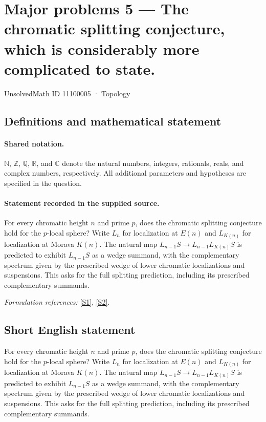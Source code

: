 \documentclass[11pt]{article}
\newcommand{\sref}[2]{\hyperlink{source:#1:#2}{[S#2]}}
\begin{document}
\setcounter{section}{11100004}
\section{Major problems 5 — The chromatic splitting conjecture, which is considerably more complicated to state.}\label{11100005}
{\small UnsolvedMath ID 11100005 · Topology}
\subsection{Definitions and mathematical statement}

\paragraph{Shared notation.}$\mathbb N$, $\mathbb Z$, $\mathbb Q$, $\mathbb R$, and $\mathbb C$ denote the natural numbers, integers, rationals, reals, and complex numbers, respectively. All additional parameters and hypotheses are specified in the question.


\paragraph{Statement recorded in the supplied source.}
For every chromatic height $n$ and prime $p$, does the chromatic splitting conjecture hold for the $p$-local sphere? Write $L_n$ for localization at $E(n)$ and $L_{K(n)}$ for localization at Morava $K(n)$. The natural map $L_{n-1}S\to L_{n-1}L_{K(n)}S$ is predicted to exhibit $L_{n-1}S$ as a wedge summand, with the complementary spectrum given by the prescribed wedge of lower chromatic localizations and suspensions. This asks for the full splitting prediction, including its prescribed complementary summands.
\par\smallskip\textit{Formulation references:} \sref{11100005}{1}, \sref{11100005}{2}.
\subsection{Short English statement}
For every chromatic height $n$ and prime $p$, does the chromatic splitting conjecture hold for the $p$-local sphere? Write $L_n$ for localization at $E(n)$ and $L_{K(n)}$ for localization at Morava $K(n)$. The natural map $L_{n-1}S\to L_{n-1}L_{K(n)}S$ is predicted to exhibit $L_{n-1}S$ as a wedge summand, with the complementary spectrum given by the prescribed wedge of lower chromatic localizations and suspensions. This asks for the full splitting prediction, including its prescribed complementary summands.
\end{document}
